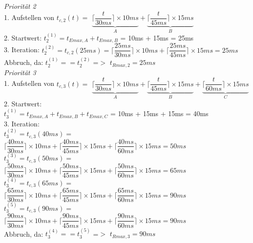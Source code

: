 \documentclass[12pt,a4paper,oneside,ngerman]{article}
\newcommand\tab[1][1cm]{\hspace*{#1}}
\begin{document}

\emph{Priorität 2}\\
1. Aufstellen von \( t_{c,2}(t) =\) \(\underbrace{\Big\lceil \dfrac{t}{ 30ms } \Big\rceil \times 10ms }_{A} + \underbrace{\Big\lceil \dfrac{t}{ 45ms } \Big\rceil \times 15ms}_{B}\) \\
2. Startwert: \( t_{2}^{(1)} = t_{Emax,A} + t_{Emax,B} \) = 10ms + 15ms = 25ms \\
3. Iteration: \( t_{2}^{(2)} = t_{c,2}(25ms) = \Big\lceil \dfrac{25ms}{30ms} \Big\rceil \times 10ms + \Big\lceil \dfrac{25ms}{45ms} \Big\rceil \times 15ms = 25ms\)\\
Abbruch, da: \( t_{2}^{(1)} == t_{2}^{(2)} \) =$>$ \( t_{Rmax,2} = 25ms \)\\

\emph{Priorität 3}\\
1. Aufstellen von \( t_{c,3}(t) =\) \(\underbrace{\Big\lceil \dfrac{t}{ 30ms } \Big\rceil \times 10ms }_{A} + \underbrace{\Big\lceil \dfrac{t}{ 45ms } \Big\rceil \times 15ms}_{B} + \underbrace{\Big\lceil \dfrac{t}{ 60ms } \Big\rceil \times 15ms}_{C}\) \\
2. Startwert:\\ \( t_{3}^{(1)} = t_{Emax,A} + t_{Emax,B} + t_{Emax,C} \) = 10ms + 15ms + 15ms = 40ms \\
3. Iteration:\\ \( t_{3}^{(2)} = t_{c,3}(40ms) =\)\\ \tab \( \Big\lceil \dfrac{40ms}{30ms} \Big\rceil \times 10ms + \Big\lceil \dfrac{40ms}{45ms} \Big\rceil \times 15ms + \Big\lceil \dfrac{40ms}{60ms} \Big\rceil \times 15ms = 50ms\)\\
				\( t_{3}^{(3)} = t_{c,3}(50ms) =\)\\ \tab \( \Big\lceil \dfrac{50ms}{30ms} \Big\rceil \times 10ms + \Big\lceil \dfrac{50ms}{45ms} \Big\rceil \times 15ms + \Big\lceil \dfrac{50ms}{60ms} \Big\rceil \times 15ms = 65ms\)\\
				\( t_{3}^{(4)} = t_{c,3}(65ms) =\)\\ \tab \( \Big\lceil \dfrac{65ms}{30ms} \Big\rceil \times 10ms + \Big\lceil \dfrac{65ms}{45ms} \Big\rceil \times 15ms + \Big\lceil \dfrac{65ms}{60ms} \Big\rceil \times 15ms = 90ms\)\\
				\( t_{3}^{(5)} = t_{c,3}(90ms) =\)\\ \tab \( \Big\lceil \dfrac{90ms}{30ms} \Big\rceil \times 10ms + \Big\lceil \dfrac{90ms}{45ms} \Big\rceil \times 15ms + \Big\lceil \dfrac{90ms}{60ms} \Big\rceil \times 15ms = 90ms\)\\
Abbruch, da: \( t_{3}^{(4)} == t_{3}^{(5)} \) =$>$ \( t_{Rmax,3} = 90ms \)\\
\end{document}
